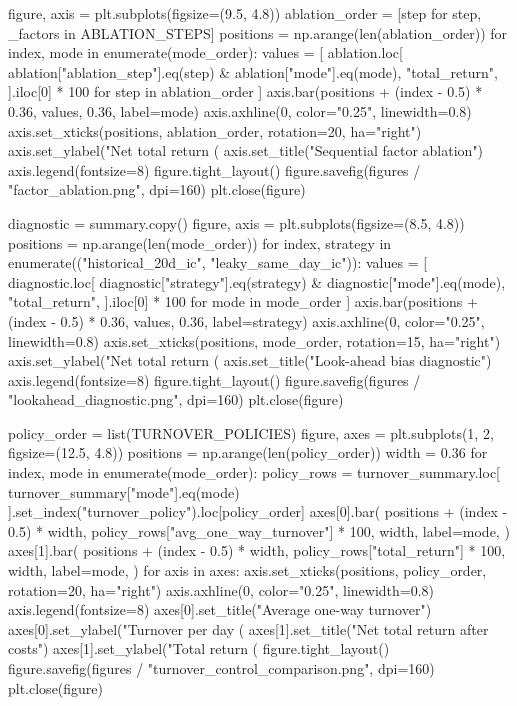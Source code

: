 \documentclass[UTF8,a4paper,fontset=fandol]{ctexart}
\begin{document}
\begin{ProjectCode}
    figure, axis = plt.subplots(figsize=(9.5, 4.8))
    ablation_order = [step for step, _factors in ABLATION_STEPS]
    positions = np.arange(len(ablation_order))
    for index, mode in enumerate(mode_order):
        values = [
            ablation.loc[
                ablation["ablation_step"].eq(step) & ablation["mode"].eq(mode),
                "total_return",
            ].iloc[0] * 100
            for step in ablation_order
        ]
        axis.bar(positions + (index - 0.5) * 0.36, values, 0.36, label=mode)
    axis.axhline(0, color="0.25", linewidth=0.8)
    axis.set_xticks(positions, ablation_order, rotation=20, ha="right")
    axis.set_ylabel("Net total return (%
    axis.set_title("Sequential factor ablation")
    axis.legend(fontsize=8)
    figure.tight_layout()
    figure.savefig(figures / "factor_ablation.png", dpi=160)
    plt.close(figure)

    diagnostic = summary.copy()
    figure, axis = plt.subplots(figsize=(8.5, 4.8))
    positions = np.arange(len(mode_order))
    for index, strategy in enumerate(("historical_20d_ic", "leaky_same_day_ic")):
        values = [
            diagnostic.loc[
                diagnostic["strategy"].eq(strategy) & diagnostic["mode"].eq(mode),
                "total_return",
            ].iloc[0] * 100
            for mode in mode_order
        ]
        axis.bar(positions + (index - 0.5) * 0.36, values, 0.36, label=strategy)
    axis.axhline(0, color="0.25", linewidth=0.8)
    axis.set_xticks(positions, mode_order, rotation=15, ha="right")
    axis.set_ylabel("Net total return (%
    axis.set_title("Look-ahead bias diagnostic")
    axis.legend(fontsize=8)
    figure.tight_layout()
    figure.savefig(figures / "lookahead_diagnostic.png", dpi=160)
    plt.close(figure)

    policy_order = list(TURNOVER_POLICIES)
    figure, axes = plt.subplots(1, 2, figsize=(12.5, 4.8))
    positions = np.arange(len(policy_order))
    width = 0.36
    for index, mode in enumerate(mode_order):
        policy_rows = turnover_summary.loc[
            turnover_summary["mode"].eq(mode)
        ].set_index("turnover_policy").loc[policy_order]
        axes[0].bar(
            positions + (index - 0.5) * width,
            policy_rows["avg_one_way_turnover"] * 100,
            width,
            label=mode,
        )
        axes[1].bar(
            positions + (index - 0.5) * width,
            policy_rows["total_return"] * 100,
            width,
            label=mode,
        )
    for axis in axes:
        axis.set_xticks(positions, policy_order, rotation=20, ha="right")
        axis.axhline(0, color="0.25", linewidth=0.8)
        axis.legend(fontsize=8)
    axes[0].set_title("Average one-way turnover")
    axes[0].set_ylabel("Turnover per day (%
    axes[1].set_title("Net total return after costs")
    axes[1].set_ylabel("Total return (%
    figure.tight_layout()
    figure.savefig(figures / "turnover_control_comparison.png", dpi=160)
    plt.close(figure)


\end{ProjectCode}
\end{document}
